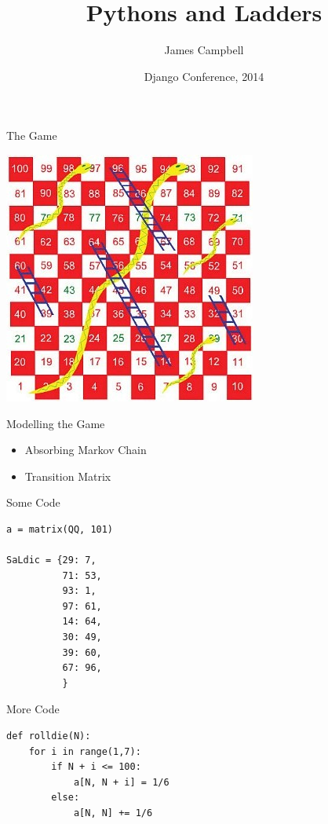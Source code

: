 \documentclass[14pt]{beamer}
\title{Pythons and Ladders}
\author{James Campbell}
\institute[Cardiff University]
  {
  Department of Mathematics\\
  Cardiff University
  }
\date{Django Conference, 2014}
\begin{document}
\begin{frame}
  \titlepage
\end{frame}

\begin{frame}{The Game}
    \begin{center}
      \includegraphics[scale=2.2]{images/SALboard}
    \end{center}
\end{frame}

\begin{frame}{Modelling the Game}
  \begin{itemize}
    \itemsep2em
    \item Absorbing Markov Chain

    \item Transition Matrix
  \end{itemize}
\end{frame}

\begin{frame}[fragile]{Some Code}
  \begin{verbatim}
a = matrix(QQ, 101)

SaLdic = {29: 7,
          71: 53,
          93: 1,
          97: 61,
          14: 64,
          30: 49,
          39: 60,
          67: 96,
          }
  \end{verbatim}
\end{frame}

\begin{frame}[fragile]{More Code}
  \begin{verbatim}
def rolldie(N):
    for i in range(1,7):
        if N + i <= 100:
            a[N, N + i] = 1/6
        else:
            a[N, N] += 1/6
  \end{verbatim}
\end{frame}
\end{document}
